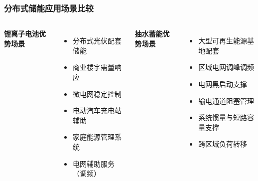 \documentclass[aspectratio=169]{beamer}
\begin{document}
\begin{frame}
    \frametitle{分布式储能应用场景比较}
    \begin{columns}
        \textbf{锂离子电池优势场景}
        \begin{itemize}
            \item 分布式光伏配套储能
            \item 商业楼宇需量响应
            \item 微电网稳定控制
            \item 电动汽车充电站辅助
            \item 家庭能源管理系统
            \item 电网辅助服务（调频）
        \end{itemize}
        
        \textbf{抽水蓄能优势场景}
        \begin{itemize}
            \item 大型可再生能源基地配套
            \item 区域电网调峰调频
            \item 电网黑启动支撑
            \item 输电通道阻塞管理
            \item 系统惯量与短路容量支撑
            \item 跨区域负荷转移
        \end{itemize}
    \end{columns}
\end{frame}
\end{document}
